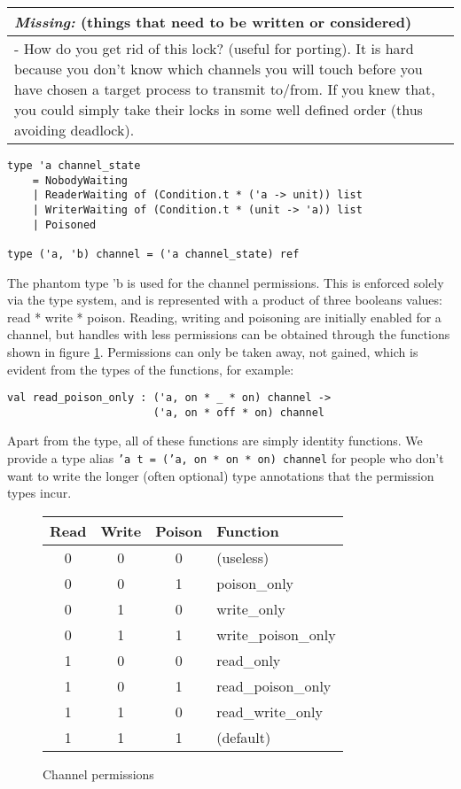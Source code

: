 \documentclass[a4paper,12pt]{article}
\newcommand{\missing}[1]{
\begin{tabular}{|p{11cm}|}
\hline
\emph{Missing:} {\scriptsize (things that need to be written or considered)} \\
\hline
#1
\hline
\end{tabular}
}
\begin{document}
\missing{
- How do you get rid of this lock? (useful for porting). It is hard because you don't know which
channels you will touch before you have chosen a target process to transmit to/from. If you knew
that, you could simply take their locks in some well defined order (thus avoiding deadlock). \\
}

\begin{verbatim}
type 'a channel_state
    = NobodyWaiting 
    | ReaderWaiting of (Condition.t * ('a -> unit)) list
    | WriterWaiting of (Condition.t * (unit -> 'a)) list
    | Poisoned

type ('a, 'b) channel = ('a channel_state) ref
\end{verbatim}

The phantom type 'b is used for the channel permissions. This is enforced solely via the type
system, and is represented with a product of three booleans values: read * write * poison.
Reading, writing and poisoning are initially enabled for a channel, but handles with less 
permissions can be obtained through the functions shown in figure \ref{channel-permissions}. 
Permissions can only be taken away, not gained, which is evident from the types of the 
functions, for example: 

\begin{verbatim}
val read_poison_only : ('a, on * _ * on) channel -> 
                       ('a, on * off * on) channel
\end{verbatim}

Apart from the type, all of these functions are simply identity functions. We provide a
type alias \texttt{'a t = ('a, on * on * on) channel} for people who don't want to write the
longer (often optional) type annotations that the permission types incur.

\begin{figure}[h]
\centering
\begin{tabular}{c|c|c|l}
Read & Write & Poison & Function \\
\hline
0 & 0 & 0 & (useless) \\
0 & 0 & 1 & poison\_only \\
0 & 1 & 0 & write\_only \\
0 & 1 & 1 & write\_poison\_only \\
1 & 0 & 0 & read\_only \\
1 & 0 & 1 & read\_poison\_only \\
1 & 1 & 0 & read\_write\_only \\
1 & 1 & 1 & (default) \\
\end{tabular}
\caption{Channel permissions}
\label{channel-permissions}
\end{figure}
\end{document}
